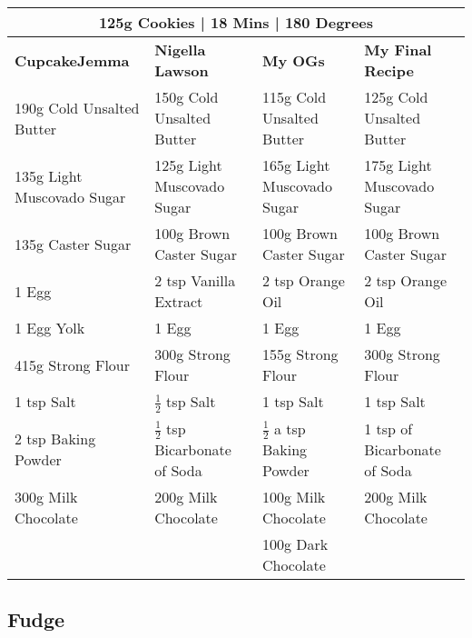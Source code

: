 \documentclass[11pt, english]{article}
\begin{document}
	\begin{table}[h]
	        \scriptsize
	\begin{center}
	\begin{tabular}{p{4cm}p{4cm}p{4cm}p{4cm}}
	        \multicolumn{4}{c}{125g Cookies | 18 Mins | 180 Degrees}\\
	        \hline
	        \textbf{CupcakeJemma} & \textbf{Nigella Lawson} & \textbf{My OGs} & \textbf{My Final Recipe}\\
	        \hline
	        190g Cold Unsalted Butter & 150g Cold Unsalted Butter & 115g Cold Unsalted Butter & 125g Cold Unsalted Butter\\
	        135g Light Muscovado Sugar & 125g Light Muscovado Sugar & 165g Light Muscovado Sugar & 175g Light Muscovado Sugar\\
	        135g Caster Sugar & 100g Brown Caster Sugar & 100g Brown Caster Sugar & 100g Brown Caster Sugar\\
	        1 Egg & 2 tsp Vanilla Extract & 2 tsp Orange Oil & 2 tsp Orange Oil\\
	        1 Egg Yolk & 1 Egg & 1 Egg & 1 Egg\\
	        415g Strong Flour & 300g Strong Flour & 155g Strong Flour & 300g Strong Flour\\
	        1 tsp Salt & $\frac{1}{2}$ tsp Salt & 1 tsp Salt & 1 tsp Salt\\
	        2 tsp Baking Powder & $\frac{1}{2}$ tsp Bicarbonate of Soda & $\frac{1}{2}$ a tsp Baking Powder & 1 tsp of Bicarbonate of Soda\\
	        300g Milk Chocolate & 200g Milk Chocolate & 100g Milk Chocolate & 200g Milk Chocolate\\
	        & & 100g Dark Chocolate & \\
	        \hline
	\end{tabular}
	\end{center}
	\end{table}

\newpage

	\subsection{Fudge}
\end{document}
